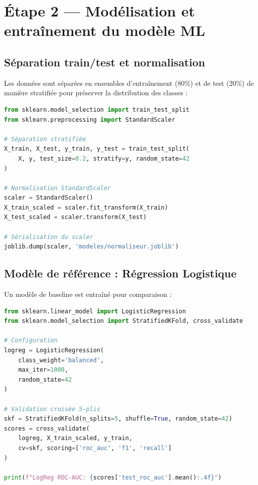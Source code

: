 \documentclass[a4paper,12pt,twoside]{report}
\begin{document}
\section{Étape 2 — Modélisation et entraînement du modèle ML}

\subsection{Séparation train/test et normalisation}

Les données sont séparées en ensembles d'entraînement (80\%) et de test (20\%) de manière stratifiée pour préserver la distribution des classes :

\begin{lstlisting}[language=Python]
from sklearn.model_selection import train_test_split
from sklearn.preprocessing import StandardScaler

# Séparation stratifiée
X_train, X_test, y_train, y_test = train_test_split(
    X, y, test_size=0.2, stratify=y, random_state=42
)

# Normalisation StandardScaler
scaler = StandardScaler()
X_train_scaled = scaler.fit_transform(X_train)
X_test_scaled = scaler.transform(X_test)

# Sérialisation du scaler
joblib.dump(scaler, 'modeles/normaliseur.joblib')
\end{lstlisting}

\subsection{Modèle de référence : Régression Logistique}

Un modèle de baseline est entraîné pour comparaison :

\begin{lstlisting}[language=Python]
from sklearn.linear_model import LogisticRegression
from sklearn.model_selection import StratifiedKFold, cross_validate

# Configuration
logreg = LogisticRegression(
    class_weight='balanced',
    max_iter=1000,
    random_state=42
)

# Validation croisée 5-plis
skf = StratifiedKFold(n_splits=5, shuffle=True, random_state=42)
scores = cross_validate(
    logreg, X_train_scaled, y_train,
    cv=skf, scoring=['roc_auc', 'f1', 'recall']
)

print(f"LogReg ROC-AUC: {scores['test_roc_auc'].mean():.4f}")
\end{lstlisting}
\end{document}
